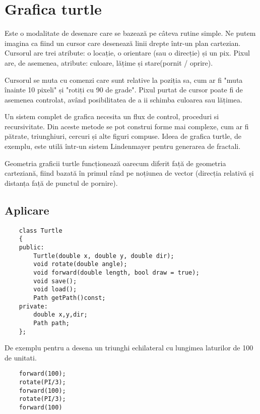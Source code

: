 \newpage
\section{Grafica turtle}

Este o modalitate de desenare care se bazează pe câteva rutine simple. Ne putem imagina ca fiind un cursor care desenează linii drepte într-un plan cartezian. 
Cursorul are trei atribute: o locație, o orientare (sau o direcție) și un pix. Pixul are, de asemenea, atribute: culoare, lățime și stare(pornit / oprire).\newline

Cursorul se muta cu comenzi care sunt relative la poziția sa, cum ar fi "muta înainte 10 pixeli" și "rotiți cu 90 de grade". 
Pixul purtat de cursor poate fi de asemenea controlat, având posibilitatea de a ii schimba culoarea sau lățimea.\newline

Un sistem complet de grafica necesita un flux de control, proceduri si recursivitate. Din aceste metode se pot construi forme mai complexe, cum ar fi pătrate, triunghiuri, cercuri și alte figuri compuse. 
Ideea de grafica turtle, de exemplu, este utilă într-un sistem Lindenmayer pentru generarea de fractali.\newline

Geometria graficii turtle funcționează oarecum diferit față de geometria carteziană, 
fiind bazată în primul rând pe noțiunea de vector (direcția relativă și distanța față de punctul de pornire).\newline

\subsection{Aplicare}

\lstset{language=C++}
\begin{lstlisting}
    class Turtle
    {
    public:
        Turtle(double x, double y, double dir);
        void rotate(double angle);
        void forward(double length, bool draw = true);
        void save();
        void load();
        Path getPath()const;
    private:
        double x,y,dir;
        Path path;
    };
\end{lstlisting}

De exemplu pentru a desena un triunghi echilateral cu lungimea laturilor de 100 de unitati.

\lstset{language=C++}
\begin{lstlisting}
    forward(100);
    rotate(PI/3);
    forward(100);
    rotate(PI/3);
    forward(100)
\end{lstlisting}


